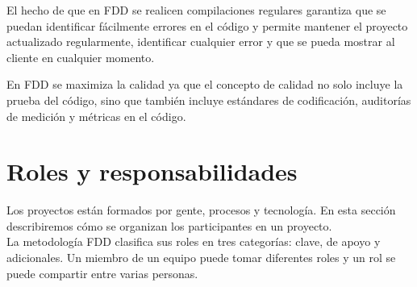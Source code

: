 \documentclass[11pt]{article}
\begin{document}
El hecho de que en FDD se realicen compilaciones regulares garantiza que se puedan identificar fácilmente errores en el código y permite mantener el proyecto actualizado regularmente, identificar cualquier error y que se pueda mostrar al cliente en cualquier momento. 

En FDD se maximiza la calidad ya que el concepto de calidad no solo incluye la prueba del código, sino que también incluye estándares de codificación, auditorías de medición y métricas en el código.

\section{Roles y responsabilidades}

Los proyectos están formados por gente, procesos y tecnología. En esta sección describiremos cómo se organizan los participantes en un proyecto.\\
La metodología FDD clasifica sus roles en tres categorías: clave, de apoyo y adicionales. Un miembro de un equipo puede tomar diferentes roles y un rol se puede compartir entre varias personas.\\
\end{document}
